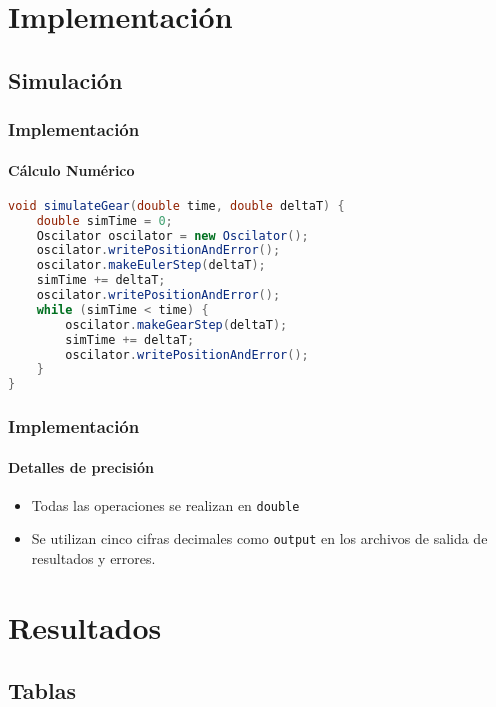 \documentclass[hyperref={pdfpagelayout=SinglePage}]{beamer}
\begin{document}
\section{Implementación}

\subsection{Simulación}

\begin{frame}[fragile]
\frametitle{Implementación}
\framesubtitle{Cálculo Numérico}
\begin{lstlisting}[language=Java, caption = Método de Gear Predictor Corrector.]
void simulateGear(double time, double deltaT) {
	double simTime = 0;
    Oscilator oscilator = new Oscilator();
	oscilator.writePositionAndError();
    oscilator.makeEulerStep(deltaT);
    simTime += deltaT;
	oscilator.writePositionAndError();
    while (simTime < time) {
    	oscilator.makeGearStep(deltaT);
        simTime += deltaT;
		oscilator.writePositionAndError();
    }
}
\end{lstlisting}
\end{frame}

\begin{frame}
\frametitle{Implementación}
\framesubtitle{Detalles de precisión}
\begin{itemize}
	\item Todas las operaciones se realizan en \texttt{double}
	\item Se utilizan cinco cifras decimales como \texttt{output} en los archivos de salida de resultados y errores.
\end{itemize}
\end{frame}

\section{Resultados}

\subsection{Tablas}
\end{document}
